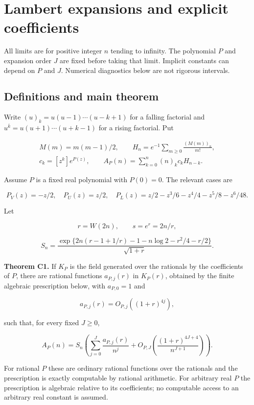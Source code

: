 \section{Lambert expansions and explicit
coefficients}\label{tcl:lambert-expansions-and-explicit-coefficients}

All limits are for positive integer \(n\) tending to infinity. The
polynomial \(P\) and expansion order \(J\) are fixed before taking that
limit. Implicit constants can depend on \(P\) and \(J\). Numerical
diagnostics below are not rigorous intervals.


\subsection{Definitions and main
theorem}\label{tcl:definitions-and-main-theorem}

Write \((u)_k=u(u-1)\cdots(u-k+1)\) for a falling factorial and
\(u^{\overline{k}}=u(u+1)\cdots(u+k-1)\) for a rising factorial. Put

\[
\begin{gathered}
 M(m)=m(m-1)/2,\qquad
 H_n=e^{-1}\sum_{m\ge0}\frac{(M(m))_n}{m!},\\
 c_k=[z^k]e^{P(z)},\qquad
 A_P(n)=\sum_{k=0}^n(n)_kc_kH_{n-k}.
\end{gathered}
\]

Assume \(P\) is a fixed real polynomial with \(P(0)=0\). The relevant
cases are

\[
 P_V(z)=-z/2,\quad P_U(z)=z/2,\quad
 P_L(z)=z/2-z^3/6-z^4/4-z^5/8-z^6/48.
\]

Let

\[
 r=W(2n),\qquad s=e^r=2n/r,
\]

\[
 S_n=\frac{\exp\{2n(r-1+1/r)-1-n\log2-r^2/4-r/2\}}{\sqrt{1+r}}.
 \tag{C1}\label{tcl:eq:C1}
\]

\textbf{Theorem C1.} If \(K_P\) is the field generated over the rationals
by the coefficients of \(P\), there are rational functions
\(a_{P,j}(r)\) in \(K_P(r)\), obtained by the finite algebraic
prescription below, with \(a_{P,0}=1\) and

\[
 a_{P,j}(r)=O_{P,j}((1+r)^{4j}),
\]

such that, for every fixed \(J\ge0\),

\[
 A_P(n)=S_n\left(\sum_{j=0}^J\frac{a_{P,j}(r)}{n^j}
 +O_{P,J}\!\left(\frac{(1+r)^{4J+4}}{n^{J+1}}\right)\right).
 \tag{C2}\label{tcl:eq:C2}
\]

For rational \(P\) these are ordinary rational functions over the
rationals and the prescription is exactly computable by rational
arithmetic. For arbitrary real \(P\) the prescription is algebraic
relative to its coefficients; no computable access to an arbitrary real
constant is assumed.

